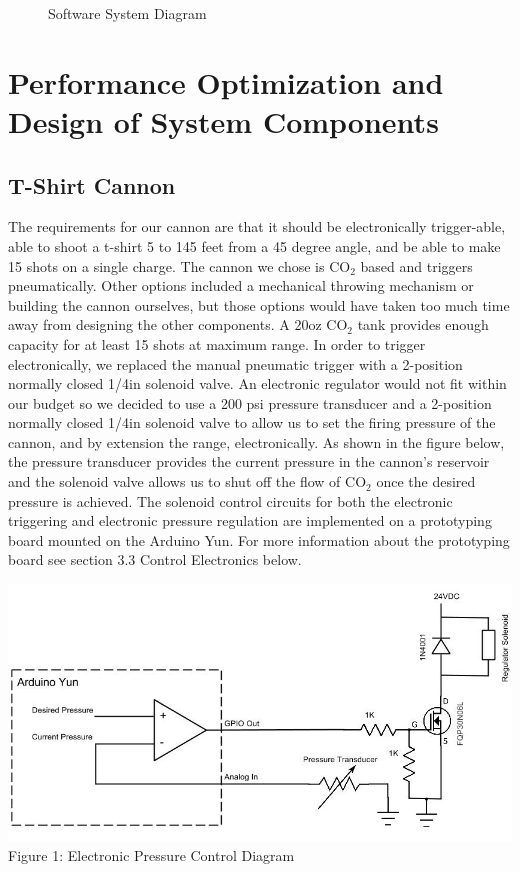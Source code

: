 \documentclass[letterpaper,12pt]{article}
\begin{document}
\begin{figure}[h!]
  \centering
  
  \caption{Software System Diagram}
  \label{fig:system_diagram}
\end{figure}


\section{Performance Optimization and Design of System Components}
\label{sec:optimization}

\subsection{T-Shirt Cannon}
The requirements for our cannon are that it should be electronically
trigger-able, able to shoot a t-shirt 5 to 145 feet from a 45 degree angle, and
be able to make 15 shots on a single charge. The cannon we chose is CO$_2$
based and triggers pneumatically. Other options included a mechanical throwing
mechanism or building the cannon ourselves, but those options would have taken
too much time away from designing the other components. A 20oz CO$_2$ tank
provides enough capacity for at least 15 shots at maximum range. In order to
trigger electronically, we replaced the manual pneumatic trigger with
a 2-position normally closed 1/4in solenoid valve. An electronic regulator
would not fit within our budget so we decided to use a 200 psi pressure
transducer and a 2-position normally closed 1/4in solenoid valve to allow us to
set the firing pressure of the cannon, and by extension the range,
electronically. As shown in the figure below, the pressure transducer provides
the current pressure in the cannon's reservoir and the solenoid valve allows us
to shut off the flow of CO$_2$ once the desired pressure is achieved. The
solenoid control circuits for both the electronic triggering and electronic
pressure regulation are implemented on a prototyping board mounted on the
Arduino Yun. For more information about the prototyping board see section 3.3
Control Electronics below.\\

\begin{center}
    \includegraphics[width=15cm]{./pics/cannon/PressureControl.jpg}\\
     Figure 1: Electronic Pressure Control Diagram
\end{center}
\end{document}
